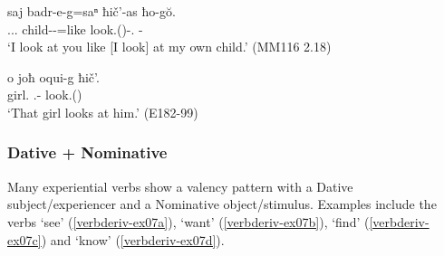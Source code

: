 \begin{exe}
	\ex\label{verbderiv-ex05}
	\begin{xlist}
		
		
			\ex\label{verbderiv-ex05a}
			\gll saj badr-e-g=saⁿ ħič'-as ħo-g\u{o}. \\
			{\Fsg}.{\Poss}.{\Emph}.{\Obl} child-{\Obl}-{\All}=like look.{\Ipfv}({\Npst})-{\Fsg}.\textbf{{\Erg}} {\Ssg}-\textbf{{\All}} \\
			\trans `I look at you like [I look] at my own child.'
			\hfill (MM116 2.18)
		
		
		
			\ex\label{verbderiv-ex05b}
			\gll o joħ oqui-g ħič'. \\
			{\Dist} girl.\textbf{{\Nom}} {\Dist}.{\Obl}-\textbf{{\All}} look.{\Ipfv}({\Npst})\\
			\trans `That girl looks at him.'
			\hfill (E182-99)
		
		
	\end{xlist}
\end{exe}

\subsubsection{Dative + Nominative}

Many experiential verbs show a valency pattern with a Dative subject/experiencer and a Nominative object/stimulus. Examples include the verbs `see' (\ref{verbderiv-ex07a}), `want' (\ref{verbderiv-ex07b}), `find' (\ref{verbderiv-ex07c}) and `know' (\ref{verbderiv-ex07d}).


